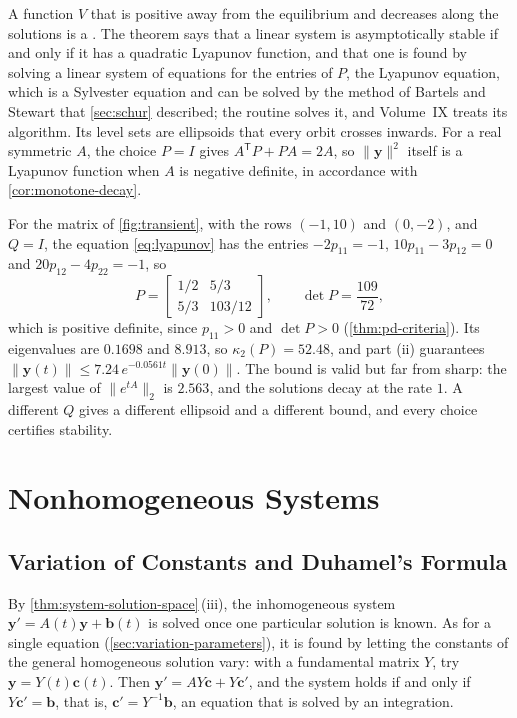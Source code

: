 A function $V$ that is positive away from the equilibrium and decreases along the solutions is a . The theorem says that a linear system is asymptotically stable if and only if it has a quadratic Lyapunov function, and that one is found by solving a linear system of equations for the entries of $P$, the Lyapunov equation, which is a Sylvester equation and can be solved by the method of Bartels and Stewart that \cref{sec:schur} described; the routine  solves it, and Volume~IX treats its algorithm. Its level sets are ellipsoids that every orbit crosses inwards. For a real symmetric $A$, the choice $P=I$ gives $A^{\mathsf T}P+PA=2A$, so $\|\mathbf y\|^2$ itself is a Lyapunov function when $A$ is negative definite, in accordance with \cref{cor:monotone-decay}.

For the matrix of \cref{fig:transient}, with the rows $(-1,10)$ and $(0,-2)$, and $Q=I$, the equation \eqref{eq:lyapunov} has the entries $-2p_{11}=-1$, $10p_{11}-3p_{12}=0$ and $20p_{12}-4p_{22}=-1$, so
\[
P=\begin{bmatrix}1/2&5/3\\5/3&103/12\end{bmatrix},\qquad\det P=\frac{109}{72},
\]
which is positive definite, since $p_{11}>0$ and $\det P>0$ (\cref{thm:pd-criteria}). Its eigenvalues are $0.1698$ and $8.913$, so $\kappa_2(P)=52.48$, and part (ii) guarantees $\|\mathbf y(t)\|\le7.24\,e^{-0.0561t}\|\mathbf y(0)\|$. The bound is valid but far from sharp: the largest value of $\|e^{tA}\|_2$ is $2.563$, and the solutions decay at the rate $1$. A different $Q$ gives a different ellipsoid and a different bound, and every choice certifies stability.

\section{Nonhomogeneous Systems}
\label{sec:nonhomogeneous-systems}

\subsection{Variation of Constants and Duhamel's Formula}

By \cref{thm:system-solution-space}\,(iii), the inhomogeneous system $\mathbf y'=A(t)\mathbf y+\mathbf b(t)$ is solved once one particular solution is known. As for a single equation (\cref{sec:variation-parameters}), it is found by letting the constants of the general homogeneous solution vary: with a fundamental matrix $Y$, try $\mathbf y=Y(t)\mathbf c(t)$. Then $\mathbf y'=AY\mathbf c+Y\mathbf c'$, and the system holds if and only if $Y\mathbf c'=\mathbf b$, that is, $\mathbf c'=Y^{-1}\mathbf b$, an equation that is solved by an integration.

